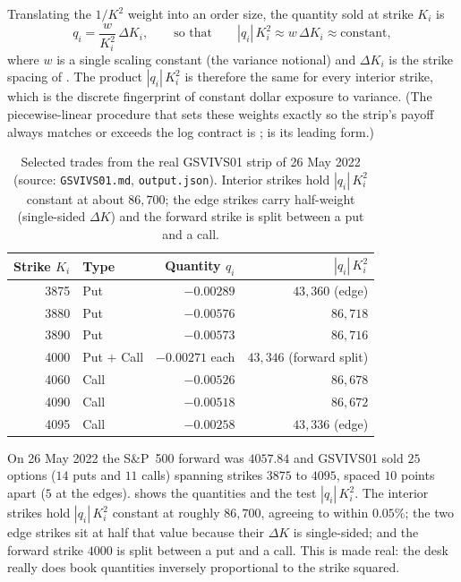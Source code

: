 Translating the $1/K^2$ weight into an order size, the quantity sold at strike $K_i$ is
\begin{equation}
\label{eq:gsvivs:quantity}
q_i = \frac{w}{K_i^2}\,\Delta K_i,
\qquad\text{so that}\qquad |q_i|\,K_i^2 \approx w\,\Delta K_i \approx \text{constant},
\end{equation}
where $w$ is a single scaling constant (the variance notional) and $\Delta K_i$ is the strike spacing of . The product $|q_i|\,K_i^2$ is therefore the same for every interior strike, which is the discrete fingerprint of constant dollar exposure to variance. (The piecewise-linear procedure that sets these weights exactly so the strip's payoff always matches or exceeds the log contract is \citet[App.~A, Eqs.~A5--A8]{Demeterfi1999};  is its leading form.)

\begin{table}[ht]
\centering
\caption{Selected trades from the real GSVIVS01 strip of 26 May 2022 (source: \texttt{GSVIVS01.md}, \texttt{output.json}). Interior strikes hold $|q_i|\,K_i^2$ constant at about $86{,}700$; the edge strikes carry half-weight (single-sided $\Delta K$) and the forward strike is split between a put and a call.}
\label{tab:gsvivs:strip}
\begin{tabular}{rlrr}
\toprule
Strike $K_i$ & Type & Quantity $q_i$ & $|q_i|\,K_i^2$ \\
\midrule
3875 & Put & $-0.00289$ & $43{,}360$ \quad(edge)\\
3880 & Put & $-0.00576$ & $86{,}718$ \\
3890 & Put & $-0.00573$ & $86{,}716$ \\
4000 & Put $+$ Call & $-0.00271$ each & $43{,}346$ \quad(forward split)\\
4060 & Call & $-0.00526$ & $86{,}678$ \\
4090 & Call & $-0.00518$ & $86{,}672$ \\
4095 & Call & $-0.00258$ & $43{,}336$ \quad(edge)\\
\bottomrule
\end{tabular}
\end{table}

\begin{workedexample}
On 26 May 2022 the S\&P~500 forward was $4057.84$ and GSVIVS01 sold $25$ options ($14$ puts and $11$ calls) spanning strikes $3875$ to $4095$, spaced $10$ points apart ($5$ at the edges).  shows the quantities and the test $|q_i|\,K_i^2$. The interior strikes hold $|q_i|\,K_i^2$ constant at roughly $86{,}700$, agreeing to within $0.05\%$; the two edge strikes sit at half that value because their $\Delta K$ is single-sided; and the forward strike $4000$ is split between a put and a call. This is  made real: the desk really does book quantities inversely proportional to the strike squared.
\end{workedexample}

